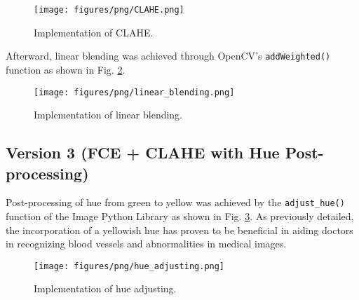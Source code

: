 \begin{figure}[h]
    \centering
    \texttt{[image: figures/png/CLAHE.png]}
    \caption{Implementation of CLAHE.}
    \label{fig:CLAHE}
\end{figure}

Afterward, linear blending was achieved through OpenCV’s \texttt{addWeighted()} function as shown in Fig. \ref{fig:linear_blending}.

\begin{figure}[h]
    \centering
    \texttt{[image: figures/png/linear\_blending.png]}
    \caption{Implementation of linear blending.}
    \label{fig:linear_blending}
\end{figure}

\subsection{Version 3 (FCE + CLAHE with Hue Post-processing)}
Post-processing of hue from green to yellow was achieved by the \texttt{adjust\_hue()} function of the Image Python Library as shown in Fig. \ref{fig:hue_adjusting}. As previously detailed, the incorporation of a yellowish hue has proven to be beneficial in aiding doctors in recognizing blood vessels and abnormalities in medical images.

\begin{figure}[h]
    \centering
    \texttt{[image: figures/png/hue\_adjusting.png]}
    \caption{Implementation of hue adjusting.}
    \label{fig:hue_adjusting}
\end{figure}

